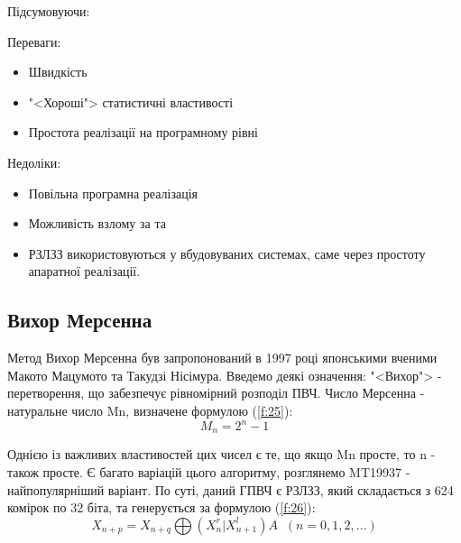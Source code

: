 \documentclass[oneside,final,14pt]{extreport}
\begin{document}
\begin{large}
Підсумовуючи:

Переваги:
\begin{itemize}
	\item 
Швидкість
	\item
"<Хороші"> статистичні властивості
	\item
Простота реалізації на програмному рівні
\end{itemize}

Недоліки:
\begin{itemize}
	\item
Повільна програмна реалізація
	\item
Можливість взлому за \cite{b7} та \cite{b8}
	\item
РЗЛЗЗ використовуються у вбудовуваних системах, саме через простоту апаратної реалізації.
\end{itemize}
\subsection{Вихор Мерсенна}\label{ss:233}

Метод Вихор Мерсенна був запропонований в 1997 році японськими вченими Макото Мацумото 
та Такудзі Нісімура. Введемо деякі означення:
"<Вихор"> - перетворення, що забезпечує рівномірний розподіл ПВЧ.
Число Мерсенна - натуральне число Mn, визначене формулою (\ref{f:25}):
\begin{equation}
	M_n=2^n-1
	\label{f:25}
\end{equation} 

Однією із важливих властивостей цих чисел є те, що якщо Mn просте, то n - також просте. 
Є багато варіацій цього алгоритму, розглянемо MT19937 - найпопулярніший варіант. По суті, 
даний ГПВЧ є  РЗЛЗЗ, який складається з 624 комірок по 32 біта, та генерується за формулою (\ref{f:26}):
\begin{equation}
X_{n+p}=X_{n+q} \bigoplus (X_n^r | X_{n+1}^l) A     \;\;      (n = 0,1,2,...)
\label{f:26}
\end{equation}


\end{large}
\end{document}
